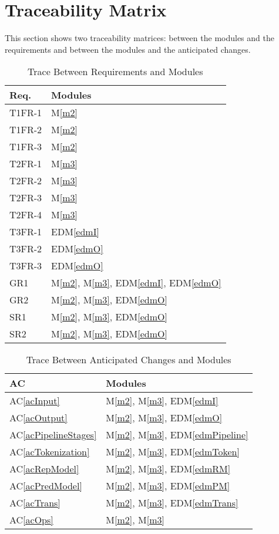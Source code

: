 \documentclass[12pt, titlepage]{article}
\newcommand{\acref}[1]{AC\ref{#1}}
\newcommand{\mref}[1]{M\ref{#1}}
\newcommand{\edmref}[1]{EDM\ref{#1}}
\begin{document}
\section{Traceability Matrix} \label{SecTM}

This section shows two traceability matrices: between the modules and the
requirements and between the modules and the anticipated changes.

\begin{table}[H]
\centering
\begin{tabular}{p{} p{}}
\toprule
\textbf{Req.} & \textbf{Modules}\\
\midrule
T1FR-1 & \mref{m2}\\
T1FR-2 & \mref{m2}\\
T1FR-3 & \mref{m2}\\
T2FR-1 & \mref{m3}\\
T2FR-2 & \mref{m3}\\
T2FR-3 & \mref{m3}\\
T2FR-4 & \mref{m3}\\
T3FR-1 & \edmref{edmI}\\
T3FR-2 & \edmref{edmO}\\
T3FR-3 & \edmref{edmO}\\
GR1 & \mref{m2}, \mref{m3}, \edmref{edmI}, \edmref{edmO}\\
GR2 & \mref{m2}, \mref{m3}, \edmref{edmO}\\
SR1 & \mref{m2}, \mref{m3}, \edmref{edmO}\\
SR2 & \mref{m2}, \mref{m3}, \edmref{edmO}\\

\bottomrule
\end{tabular}
\caption{Trace Between Requirements and Modules}
\label{TblRT}
\end{table}

\begin{table}[H]
\centering
\begin{tabular}{p{} p{}}
\toprule
\textbf{AC} & \textbf{Modules}\\
\midrule
\acref{acInput} & \mref{m2}, \mref{m3}, \edmref{edmI}\\
\acref{acOutput} & \mref{m2}, \mref{m3}, \edmref{edmO}\\
\acref{acPipelineStages} & \mref{m2}, \mref{m3}, \edmref{edmPipeline}\\
\acref{acTokenization} & \mref{m2}, \mref{m3}, \edmref{edmToken}\\
\acref{acRepModel} & \mref{m2}, \mref{m3}, \edmref{edmRM}\\
\acref{acPredModel} & \mref{m2}, \mref{m3}, \edmref{edmPM}\\
\acref{acTrans} & \mref{m2}, \mref{m3}, \edmref{edmTrans}\\
\acref{acOps} & \mref{m2}, \mref{m3}\\

\bottomrule
\end{tabular}
\caption{Trace Between Anticipated Changes and Modules}
\label{TblACT}
\end{table}
\end{document}
